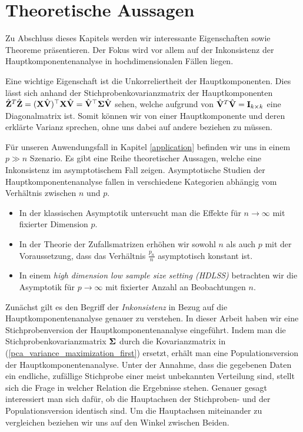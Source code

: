 

\section{Theoretische Aussagen}
\label{pca_theorems}

Zu Abschluss dieses Kapitels werden wir interessante Eigenschaften sowie Theoreme präsentieren. Der Fokus wird vor allem auf der Inkonsistenz der Hauptkomponentenanalyse in hochdimensionalen Fällen liegen.

Eine wichtige Eigenschaft ist die Unkorreliertheit der Hauptkomponenten. Dies lässt sich anhand der Stichprobenkovarianzmatrix der Hauptkomponenten $\hat{\mathbf{Z}}^T \hat{\mathbf{Z}} = (\mathbf{X} \hat{\mathbf{V}})^{\top}\mathbf{X} \hat{\mathbf{V}} = \hat{\mathbf{V}}^{\top}\mathbf{\Sigma}\hat{\mathbf{V}}$ sehen, welche aufgrund von $\hat{\mathbf{V}}^T \hat{\mathbf{V}} = \mathbf{I}_{k \times k}$ eine Diagonalmatrix ist. Somit können wir von einer Hauptkomponente und deren erklärte Varianz sprechen, ohne uns dabei auf andere beziehen zu müssen.

Für unseren Anwendungsfall in Kapitel \ref{application} befinden wir uns in einem $p \gg n$ Szenario. Es gibt eine Reihe theoretischer Aussagen, welche eine Inkonsistenz im asymptotischem Fall zeigen. Asymptotische Studien der Hauptkomponentenanalyse fallen in verschiedene Kategorien abhängig vom Verhältnis zwischen $n$ und $p$.
\begin{itemize}
\item In der klassischen Asymptotik untersucht man die Effekte für $n \rightarrow \infty$ mit fixierter Dimension $p$.
\item In der Theorie der Zufallsmatrizen erhöhen wir sowohl $n$ als auch $p$ mit der Voraussetzung, dass das Verhältnis $\frac{p_n}{n}$ asymptotisch konstant ist.
\item In einem \textit{high dimension low sample size setting (HDLSS)} betrachten wir die Asymptotik für $p \rightarrow \infty$ mit fixierter Anzahl an Beobachtungen $n$.
\end{itemize}
Zunächst gilt es den Begriff der \textit{Inkonsistenz} in Bezug auf die Hauptkomponentenanalyse genauer zu verstehen. In dieser Arbeit haben wir eine Stichprobenversion der Hauptkomponentenanalyse eingeführt. Indem man die Stichprobenkovarianzmatrix $\mathbf{\Sigma}$ durch die Kovarianzmatrix in (\ref{pca_variance_maximization_first}) ersetzt, erhält man eine Populationsversion der Hauptkomponentenanalyse. Unter der Annahme, dass die gegebenen Daten ein endliche, zufällige Stichprobe einer meist unbekannten Verteilung sind, stellt sich die Frage in welcher Relation die Ergebnisse stehen. Genauer gesagt interessiert man sich dafür, ob die Hauptachsen der Stichproben- und der Populationsversion identisch sind. Um die Hauptachsen miteinander zu vergleichen beziehen wir uns auf den Winkel zwischen Beiden.

